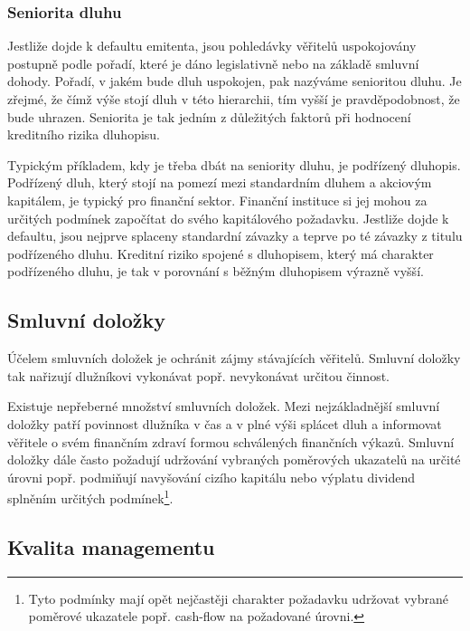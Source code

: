 \documentclass[a4paper]{book}
\begin{document}
\subsubsection{Seniorita dluhu}

Jestliže dojde k defaultu emitenta, jsou pohledávky věřitelů uspokojovány postupně podle pořadí, které je dáno legislativně nebo na základě smluvní dohody. Pořadí, v jakém bude dluh uspokojen, pak nazýváme senioritou dluhu. Je zřejmé, že čímž výše stojí dluh v této hierarchii, tím vyšší je pravděpodobnost, že bude uhrazen. Seniorita je tak jedním z důležitých faktorů při hodnocení kreditního rizika dluhopisu.

Typickým příkladem, kdy je třeba dbát na seniority dluhu, je podřízený dluhopis. Podřízený dluh, který stojí na pomezí mezi standardním dluhem a akciovým kapitálem, je typický pro finanční sektor. Finanční instituce si jej mohou za určitých podmínek započítat do svého kapitálového požadavku. Jestliže dojde k defaultu, jsou nejprve splaceny standardní závazky a teprve po té závazky z titulu podřízeného dluhu. Kreditní riziko spojené s dluhopisem, který má charakter podřízeného dluhu, je tak v porovnání s běžným dluhopisem výrazně vyšší.

\subsection{Smluvní doložky}

Účelem smluvních doložek je ochránit zájmy stávajících věřitelů. Smluvní doložky tak nařizují dlužníkovi vykonávat popř. nevykonávat určitou činnost.

Existuje nepřeberné množství smluvních doložek. Mezi nejzákladnější smluvní doložky patří povinnost dlužníka v čas a v plné výši splácet dluh a informovat věřitele o svém finančním zdraví formou schválených finančních výkazů. Smluvní doložky dále často požadují udržování vybraných poměrových ukazatelů na určité úrovni popř. podmiňují navyšování cizího kapitálu nebo výplatu dividend splněním určitých podmínek\footnote{Tyto podmínky mají opět nejčastěji charakter požadavku udržovat vybrané poměrové ukazatele popř. cash-flow na požadované úrovni.}.

\subsection{Kvalita managementu}
\end{document}
